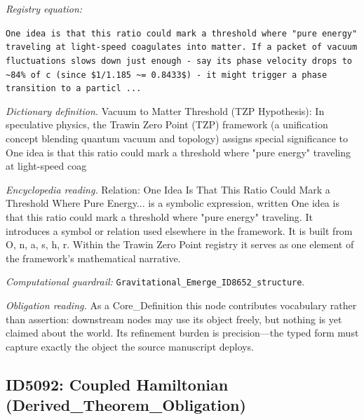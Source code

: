 \documentclass[11pt]{article}
\theoremstyle{remark}
\begin{document}
\noindent\textit{Registry equation:}\par
{\small\texttt{One idea is that this ratio could mark a threshold where "pure energy" traveling at light-speed coagulates into matter. If a packet of vacuum fluctuations slows down just enough - say its phase velocity drops to \textasciitilde{}84\% of c (since \$1/1.185 \textasciitilde{}= 0.8433\$) - it might trigger a phase transition to a particl ...}}\par\medskip
\noindent\textit{Dictionary definition.} Vacuum to Matter Threshold (TZP Hypothesis): In speculative physics, the Trawin Zero Point (TZP) framework (a unification concept blending quantum vacuum and topology) assigns special significance to One idea is that this ratio could mark a threshold where "pure energy" traveling at light-speed coag\par\medskip
\noindent\textit{Encyclopedia reading.} Relation: One Idea Is That This Ratio Could Mark a Threshold Where Pure Energy... is a symbolic expression, written One idea is that this ratio could mark a threshold where "pure energy" traveling. It introduces a symbol or relation used elsewhere in the framework. It is built from O, n, a, s, h, r. Within the Trawin Zero Point registry it serves as one element of the framework's mathematical narrative.
\par\medskip\noindent\textit{Computational guardrail:} \texttt{Gravitational\_Emerge\_ID8652\_structure}.
\par\medskip\noindent\textit{Obligation reading.} As a Core\_Definition this node contributes vocabulary rather than assertion: downstream nodes may use its object freely, but nothing is yet claimed about the world. Its refinement burden is precision---the typed form must capture exactly the object the source manuscript deploys.

\subsection{ID5092: Coupled Hamiltonian (Derived\_Theorem\_Obligation)}
\end{document}
